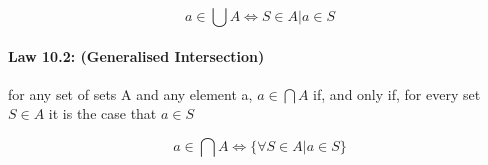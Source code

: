 \documentclass[twocolumn]{article}
\begin{document}
$$a  \in   \bigcup A \iff S  \in  A|a  \in  S$$

\paragraph{Law 10.2: (Generalised Intersection)} for any set of sets A and any element a, $a  \in  \bigcap A$ if, and only if, for every set $ S  \in  A $ it is the case that $ a  \in  S$

$$a  \in   \bigcap  A \iff \{ \forall S  \in  A |a  \in  S \}$$
\end{document}
